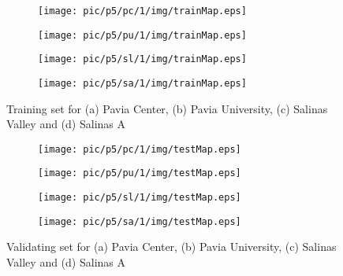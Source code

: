 \documentclass{article}
\begin{document}
	\begin{figure}[htbp]
		\begin{subfigure}{0.24\textwidth}
			\texttt{[image: pic/p5/pc/1/img/trainMap.eps]}
			\caption{}
		\end{subfigure}
		\begin{subfigure}{0.24\textwidth}
			\texttt{[image: pic/p5/pu/1/img/trainMap.eps]}
			\caption{}
		\end{subfigure}
		\begin{subfigure}{0.24\textwidth}
			\texttt{[image: pic/p5/sl/1/img/trainMap.eps]}
			\caption{}
		\end{subfigure}
		\begin{subfigure}{0.24\textwidth}
			\texttt{[image: pic/p5/sa/1/img/trainMap.eps]}
			\caption{}
		\end{subfigure}
		\caption{Training set for (a) Pavia Center, (b) Pavia University, (c) Salinas Valley and (d) Salinas A}
		\label{trainMaps}
	\end{figure}

	\begin{figure}[htbp]
		\begin{subfigure}{0.24\textwidth}
			\texttt{[image: pic/p5/pc/1/img/testMap.eps]}
			\caption{}
		\end{subfigure}
		\begin{subfigure}{0.24\textwidth}
			\texttt{[image: pic/p5/pu/1/img/testMap.eps]}
			\caption{}
		\end{subfigure}
		\begin{subfigure}{0.24\textwidth}
			\texttt{[image: pic/p5/sl/1/img/testMap.eps]}
			\caption{}
		\end{subfigure}
		\begin{subfigure}{0.24\textwidth}
			\texttt{[image: pic/p5/sa/1/img/testMap.eps]}
			\caption{}
		\end{subfigure}
		\caption{Validating set for (a) Pavia Center, (b) Pavia University, (c) Salinas Valley and (d) Salinas A}
		\label{testMaps}
	\end{figure}
\end{document}
